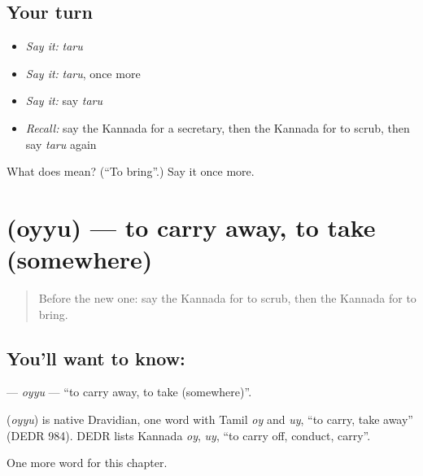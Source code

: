 \subsection*{Your turn}
\begin{itemize}
\raggedright
  \item \emph{Say it:} \emph{taru}
  \item \emph{Say it:} \emph{taru}, once more
  \item \emph{Say it:} say \emph{taru}
  \item \emph{Recall:} say the Kannada for a secretary, then the Kannada for to scrub, then say \emph{taru} again
\end{itemize}

\begin{tcolorbox}[breakable,colback=teal!4,colframe=teal!35!black,title={Before you move on}]
What does  mean? (\textquotedblleft{}To bring\textquotedblright{}.) Say it once more.
\end{tcolorbox}
\section[\texorpdfstring{\kn{ಒಯ್ಯು} (oyyu)}{ಒಯ್ಯು (oyyu)}]{ (oyyu) — to carry away, to take (somewhere)}

\label{lesson:KA-C198-oyyu}



\begin{quote}
Before the new one: say the Kannada for to scrub, then the Kannada for to bring.
\end{quote}

\subsection*{You'll want to know: }
\textbf{} — \emph{oyyu} — \textquotedblleft{}to carry away, to take (somewhere)\textquotedblright{}.

\begin{cousinweb}
\textbf{} (\emph{oyyu}) is native Dravidian, one word with Tamil \emph{oy} and \emph{uy}, \textquotedblleft{}to carry, take away\textquotedblright{} (DEDR 984). DEDR lists Kannada \emph{oy}, \emph{uy}, \textquotedblleft{}to carry off, conduct, carry\textquotedblright{}.
\end{cousinweb}

\begin{grammarlens}[title={What you've built}]
One more word for this chapter.
\end{grammarlens}

